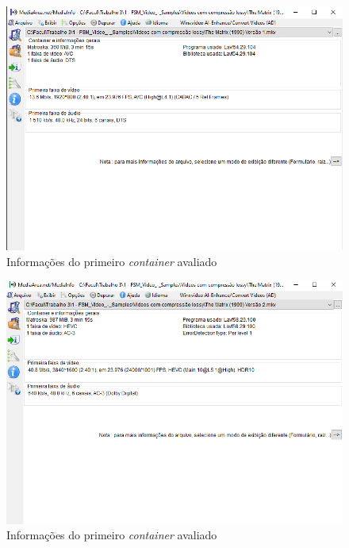 \begin{figure}[H]
    \centering
    \caption{Informações do primeiro \textit{container} avaliado}
    \label{fig:imagem3}
    \includegraphics[scale=0.5]{Documeto/1-ElementosTextuais/images/03.png}
    
    \autoriaPropria
\end{figure}

\begin{figure}[H]
    \centering
    \caption{Informações do primeiro \textit{container} avaliado}
    \label{fig:imagem4}
    \includegraphics[scale=0.5]{Documeto/1-ElementosTextuais/images/04.png}
    
    \autoriaPropria
\end{figure}


